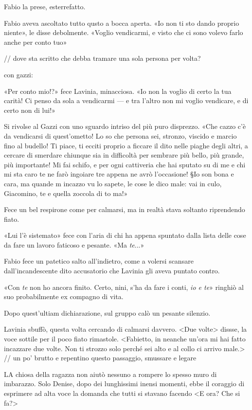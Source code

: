 Fabio la prese, esterrefatto.

Fabio aveva ascoltato tutto qusto a bocca aperta. «Io non ti sto dando proprio niente», le disse debolmente. «Voglio vendicarmi, e visto che ci sono volevo farlo anche per conto tuo»

// dove sta scritto che debba tramare una sola persona per volta?

con gazzi:

«Per conto mio!?» fece Lavinia, minacciosa. «Io non la voglio di certo la tua carità! Ci penso da sola a vendicarmi --- e tra l'altro non mi voglio vendicare, e di certo non di lui!»

Si rivolse al Gazzi con uno sguardo intriso del più puro disprezzo. «Che cazzo c'è da vendicarsi di quest'ometto! Lo so che persona sei, stronzo, viscido e marcio fino al budello! Ti piace, ti ecciti proprio a ficcare il dito nelle piaghe degli altri, a cercare di smerdare chiunque sia in difficoltà per sembrare più bello, più grande, più importante! Mi fai schifo, e per ogni cattiveria che hai sputato su di me e chi mi sta caro te ne farò ingoiare tre appena ne avrò l'occasione! §Io son bona e cara, ma quande m incazzo vu lo sapete, le cose le dico male: vai in culo, Giacomino, te e quella zoccola di to ma!»

Fece un bel respirone come per calmarsi, ma in realtà stava soltanto riprendendo fiato.

«Lui l'è sistemato» fece con l'aria di chi ha appena spuntato dalla lista delle cose da fare un lavoro faticoso e pesante. «Ma \emph{te}...»

Fabio fece un patetico salto all'indietro, come a volersi scansare dall'incandescente dito accusatorio che Lavinia gli aveva puntato contro.

«Con \emph{te} non ho ancora finito. Certo, nini, s'ha da fare i conti, \emph{io e te}» ringhiò al suo probabilmente ex compagno di vita.

Dopo quest'ultiam dichiarazione, sul gruppo calò un pesante silenzio.

Lavinia sbuffò, questa volta cercando di calmarsi davvero. <Due volte> dissse, la voce sottile per il poco fiato rimastole. <Fabietto, in neanche un'ora mi hai fatto incazzare due volte. Non ti strozzo solo perché sei alto e al collo ci arrivo male.>
// un po' brutto e repentino questo passaggio, smussare e legare

LA chiosa della ragazza non aiutò nessuno a rompere lo spesso muro di imbarazzo. Solo Denise, dopo dei lunghissimi inensi momenti, ebbe il coraggio di esprimere ad alta voce la domanda che tutti si stavano facendo
<E ora? Che si fa?>


